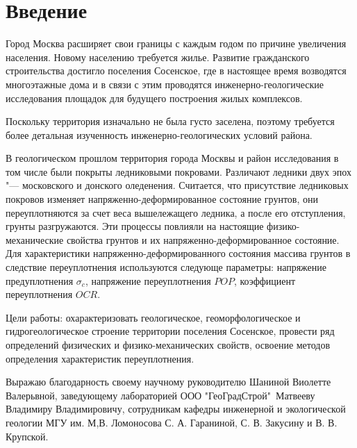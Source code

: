 \chapter*{Введение}                         %

Город Москва расширяет свои границы с каждым годом по причине увеличения населения. 
Новому населению требуется жилье. Развитие гражданского строительства достигло поселения 
Сосенское, где в настоящее время возводятся многоэтажные дома и в связи с этим проводятся 
инженерно-геологические исследования площадок для будущего построения жилых 
комплексов. %



Поскольку территория изначально не была густо заселена, поэтому требуется более детальная 
изученность инженерно-геологических условий района.

%
В геологическом прошлом территория города Москвы и район исследования в том числе были 
покрыты ледниковыми покровами. Различают ледники двух эпох "--- московского и донского оледенения. 
Считается, что присутствие ледниковых покровов изменяет напряженно-деформированное состояние 
грунтов, они переуплотняются за счет веса вышележащего ледника, а после его отступления, 
грунты разгружаются. Эти процессы повлияли на настоящие физико-механические свойства грунтов 
и их напряженно-деформированное состояние. Для характеристики напряженно-деформированного 
состояния массива грунтов в следствие переуплотнения используются следующе параметры:
напряжение предуплотнения $\sigma_c$, 
напряжение переуплотнения $POP$,
коэффициент переуплотнения $OCR$.

Цели работы: охарактеризовать геологическое, геоморфологическое и 
гидрогеологическое строение территории поселения Сосенское, провести ряд 
определений физических и физико-механических 
свойств, освоение методов определения характеристик переуплотнения.


Выражаю благодарность своему научному руководителю Шаниной 
Виолетте Валерьвной, заведующему лабораторией ООО "ГеоГрадСтрой"\ 
Матвееву Владимиру Владимировичу, сотрудникам кафедры инженерной 
и экологической геологии МГУ им. М,В. Ломоносова С. А. Гараниной, С. В. Закусину и 
В. В. Крупской.
